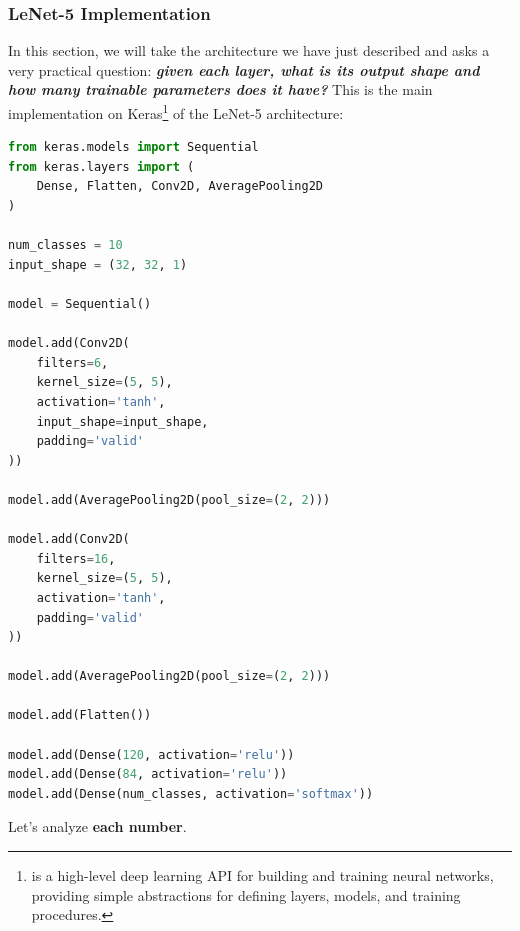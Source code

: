 \subsubsection{LeNet-5 Implementation}\label{sec:lenet-5-implementation}

In this section, we will take the architecture we have just described and asks a very practical question: \emph{\textbf{given each layer, what is its output shape and how many trainable parameters does it have?}} This is the main implementation on Keras\footnote{%
     is a high-level deep learning API for building and training neural networks, providing simple abstractions for defining layers, models, and training procedures.
} of the LeNet-5 architecture:
\begin{lstlisting}[language=Python, label=lst:lenet-5-implementation]
from keras.models import Sequential
from keras.layers import (
    Dense, Flatten, Conv2D, AveragePooling2D
)

num_classes = 10
input_shape = (32, 32, 1)

model = Sequential()

model.add(Conv2D(
    filters=6,
    kernel_size=(5, 5),
    activation='tanh',
    input_shape=input_shape,
    padding='valid'
))

model.add(AveragePooling2D(pool_size=(2, 2)))

model.add(Conv2D(
    filters=16,
    kernel_size=(5, 5),
    activation='tanh',
    padding='valid'
))

model.add(AveragePooling2D(pool_size=(2, 2)))

model.add(Flatten())

model.add(Dense(120, activation='relu'))
model.add(Dense(84, activation='relu'))
model.add(Dense(num_classes, activation='softmax'))
\end{lstlisting}
Let's analyze \textbf{each number}.
